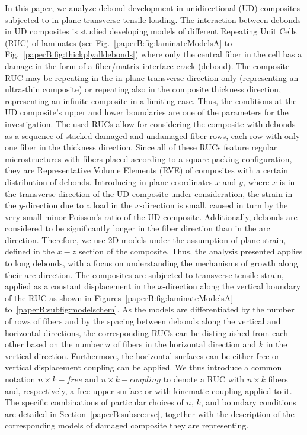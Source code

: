 In this paper, we analyze debond development in unidirectional (UD) composites subjected to in-plane transverse tensile loading.  The interaction between debonds in UD composites is studied developing models of different Repeating Unit Cells (RUC) of laminates (see Fig.~\ref{paperB:fig:laminateModelsA} to Fig.~\ref{paperB:fig:thickplyalldebonds}) where only the central fiber in the cell has a damage in the form of a fiber/matrix interface crack (debond). The composite RUC may be repeating in the in-plane transverse direction only (representing an ultra-thin composite) or repeating also in the composite thickness direction, representing an infinite composite in a limiting case. Thus, the conditions at the UD composite's upper and lower boundaries are one of the parameters for the investigation.  The used RUCs allow for considering the composite with debonds as a sequence of stacked damaged and undamaged fiber rows, each row with only one fiber in the thickness direction. Since all of these RUCs feature regular microstructures with fibers placed according to a square-packing configuration, they are Representative Volume Elements (RVE) of composites with a certain distribution of debonds. Introducing in-plane coordinates $x$ and $y$, where $x$ is in the transverse direction of the UD composite under consideration, the strain in the $y$-direction due to a load in the $x$-direction is small, caused in turn by the very small minor Poisson's ratio of the UD composite. Additionally, debonds are considered to be significantly longer in the fiber direction than in the arc direction. Therefore, we use 2D models under the assumption of plane strain, defined in the $x-z$ section of the composite.  Thus, the analysis presented applies to long debonds, with a focus on understanding the mechanisms of growth along their arc direction. The composites are subjected to transverse tensile strain, applied as a constant displacement in the $x$-direction along the vertical boundary of the RUC as shown in  Figures~\ref{paperB:fig:laminateModelsA} to~\ref{paperB:subfig:modelschem}. As the models are differentiated by the number of rows of fibers and by the spacing between debonds along the vertical and horizontal directions, the corresponding RUCs can be distinguished from each other based on the number $n$ of fibers in the horizontal direction and $k$ in the vertical direction. Furthermore, the horizontal surfaces can be either free or vertical displacement coupling can be applied. We thus introduce a common notation $n\times k-free$  and $n\times k-coupling$ to denote a RUC with $n\times k$ fibers and, respectively, a free upper surface or with kinematic coupling applied to it. The specific combinations of particular choices of $n$, $k$, and boundary conditions are detailed in Section~\ref{paperB:subsec:rve}, together with the description of the corresponding models of damaged composite they are representing.

